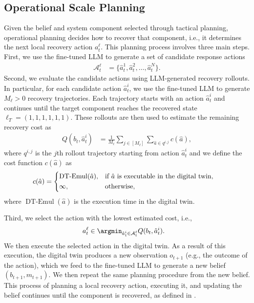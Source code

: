 \documentclass[sigconf]{acmart}
\begin{document}
\subsection{Operational Scale Planning}\label{sec:local-plan}
Given the belief and system component selected through tactical planning, operational planning decides how to recover that component, i.e., it determines the next local recovery action $a^{\ell}_t$. This planning process involves three main steps. First, we use the fine-tuned LLM to generate a set of candidate response actions
\begin{align*}
\mathcal{A}^{\ell}_t &= \{\hat{a}^1_t, \hat{a}^2_t, \hdots, \hat{a}^N_t\}.
\end{align*}
Second, we evaluate the candidate actions using LLM-generated recovery rollouts. In particular, for each candidate action $\hat{a}^i_t$, we use the fine-tuned LLM to generate $M_{\ell} > 0$ recovery trajectories. Each trajectory starts with an action $\hat{a}^i_t$ and continues until the target component reaches the recovered state $\ell_T = (1,1,1,1,1,1)$. These rollouts are then used to estimate the remaining recovery cost as
\begin{align*}
Q(b_t, \hat{a}^i_t) &= \frac{1}{M_{\ell}}\sum_{j \in [M_{\ell}]}\sum_{\hat{a} \in q^{i,j}}c(\hat{a}),
\end{align*}
where $q^{i,j}$ is the $j$th rollout trajectory starting from action $\hat{a}^i_t$ and we define the cost function $c(\hat{a})$ as
\begin{align*}  
c(\hat{a}) &=
\begin{dcases}
\operatorname{DT-Emul}(\hat a), & \text{if }\hat{a} \text{ is executable in the digital twin},\\
\infty,  & \text{otherwise},
\end{dcases}               
\end{align*}
where $\operatorname{DT-Emul}(\hat{a})$ is the execution time in the digital twin.

Third, we select the action with the lowest estimated cost, i.e.,
\begin{align*}
a^{\ell}_t &\in \argmin_{\hat{a}^i_t \in \mathcal{A}^{\ell}_t} Q(b_t, \hat{a}^i_t).
\end{align*}
We then execute the selected action in the digital twin. As a result of this execution, the digital twin produces a new observation $o_{t+1}$ (e.g., the outcome of the action), which we feed to the fine-tuned LLM to generate a new belief $(b_{t+1}, m_{t+1})$. We then repeat the same planning procedure from the new belief. This process of planning a local recovery action, executing it, and updating the belief continues until the component is recovered, as defined in .
\end{document}
